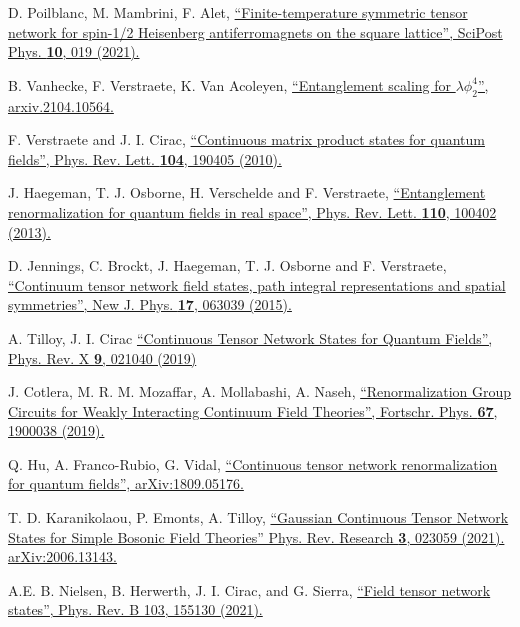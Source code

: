 \documentclass[a4paper,preprintnumbers,nofootinbib,twocolumn]{quantumarticle}
\begin{document}
\begin{thebibliography}{99}
 D. Poilblanc, M. Mambrini, F. Alet,
\href{https://scipost.org/10.21468/SciPostPhys.10.1.019}{
``Finite-temperature symmetric tensor network for spin-1/2 Heisenberg antiferromagnets on the square lattice'',
SciPost Phys. {\bf 10}, 019 (2021).
}

 B. Vanhecke, F. Verstraete, K. Van Acoleyen, 
\href{https://arxiv.org/abs/2104.10564}{
``Entanglement scaling for $\lambda \phi_2^4$'', 
arxiv.2104.10564.
}




  F. Verstraete and J. I. Cirac,
\href{https://doi.org/10.1103/PhysRevLett.104.190405}{
``Continuous matrix product states for quantum fields'',
Phys. Rev. Lett. {\bf 104}, 190405 (2010).
}

  J.  Haegeman, T. J. Osborne, H. Verschelde and F. Verstraete,
\href{https://doi.org/10.1103/PhysRevLett.110.100402}{
``Entanglement renormalization for quantum fields in real space'',
Phys. Rev. Lett. {\bf 110}, 100402 (2013).
}

  D. Jennings, C. Brockt, J. Haegeman, T. J.  Osborne and F.  Verstraete,
\href{https://doi.org/10.1088/1367-2630/17/6/063039}{
``Continuum tensor network field states, path integral representations and spatial symmetries'',
New J. Phys. {\bf 17}, 063039 (2015).
}

A. Tilloy, J. I.  Cirac
\href{https://doi.org/10.1103/PhysRevX.9.021040}{
``Continuous Tensor Network States for Quantum Fields'',
Phys. Rev. X {\bf 9}, 021040 (2019)
}

  J. Cotlera, M. R. M. Mozaffar, A. Mollabashi, A. Naseh,
\href{https://doi.org/10.1002/prop.201900038}{
``Renormalization Group Circuits for Weakly Interacting Continuum Field Theories'',
Fortschr. Phys. {\bf 67}, 1900038 (2019).
}

  Q.  Hu, A. Franco-Rubio, G. Vidal,
\href{https://arxiv.org/abs/1809.05176}{
``Continuous tensor network renormalization for quantum fields'',
arXiv:1809.05176.
}

 T.  D. Karanikolaou, P.  Emonts, A.  Tilloy, 
\href{https://doi.org/10.1103/PhysRevResearch.3.023059}{
``Gaussian Continuous Tensor Network States for Simple Bosonic Field Theories''
Phys. Rev. Research {\bf 3}, 023059 (2021). 
arXiv:2006.13143.
}

 A.E. B. Nielsen, B. Herwerth, J. I. Cirac, and G. Sierra,
\href{https://doi.org/10.1103/PhysRevB.103.155130}{
``Field tensor network states'',
Phys. Rev. B 103, 155130 (2021).
}


\end{thebibliography}
\end{document}
